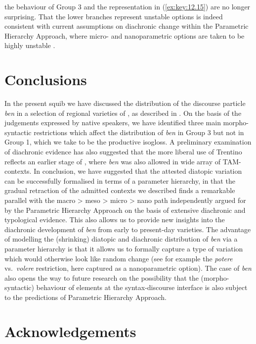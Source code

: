 \documentclass[output=paper]{langsci/langscibook}
\begin{document}
the behaviour of Group 3 and the representation in (\ref{ex:key:12.15}) are no longer
surprising. That the lower branches represent unstable options is indeed
consistent with current assumptions on diachronic change within the Parametric
Hierarchy Approach, where micro- and nanoparametric options are taken to be
highly unstable \parencite[261]{BibRob2016}.

\section{Conclusions}\label{sec:23-conclusions}

In the present squib we have discussed the distribution of the discourse
particle \emph{ben} in a selection of regional varieties of , as
described in \textcite{CognSchi2015,CognSchi2018b,CognSchi2018}. On the basis
of the judgements expressed by native speakers, we have identified three main
morpho-syntactic restrictions which affect the distribution of \emph{ben} in
Group 3 but not in Group 1, which we take to be the productive isogloss. A
preliminary examination of diachronic evidence has also suggested that the more
liberal use of Trentino reflects an earlier stage of , where
\emph{ben} was also allowed in wide array of TAM-contexts. In conclusion, we
have suggested that the attested diatopic variation can be successfully
formalised in terms of a parameter hierarchy, in that the gradual retraction of
the admitted contexts we described finds a remarkable parallel with the macro >
meso > micro > nano path independently argued for by the Parametric Hierarchy
Approach on the basis of extensive diachronic and typological evidence. This
also allows us to provide new insights into the diachronic development of
\emph{ben} from early  to present-day varieties. The advantage of
modelling the (shrinking) diatopic and diachronic distribution of \emph{ben}
via a parameter hierarchy is that it allows us to formally capture a type of
variation which would otherwise look like random change (see for example the
\emph{potere} vs.\ \emph{volere} restriction, here captured as a nanoparametric
option). The case of  \emph{ben} also opens the way to future research
on the possibility that the (morpho-syntactic) behaviour of elements at the
syntax-discourse interface is also subject to the predictions of Parametric
Hierarchy Approach.

\printchapterglossary{}

\section*{Acknowledgements}
\end{document}
